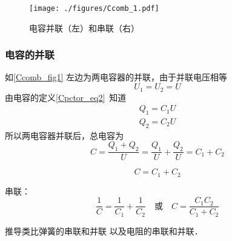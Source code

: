 

\begin{figure}[ht]
\centering
\texttt{[image: ./figures/Ccomb\_1.pdf]}
\caption{电容并联（左）和串联（右）} \label{Ccomb_fig1}
\end{figure}

\subsubsection{电容的并联}
如\autoref{Ccomb_fig1} 左边为两电容器的并联，由于并联电压相等
\begin{equation}
U_1=U_2=U
\end{equation}
由电容的定义\autoref{Cpctor_eq2}~知道
\begin{equation}
\begin{aligned}
Q_1=C_1U\\
Q_2=C_2U
\end{aligned}
\end{equation}
所以两电容器并联后，总电容为
\begin{equation}
C=\frac{Q_1+Q_2}{U}=\frac{Q_1}{U}+\frac{Q_2}{U}=C_1+C_2
\end{equation}


\begin{equation}
C = C_1 + C_2
\end{equation}

串联：
\begin{equation}
\frac{1}{C} = \frac{1}{C_1} + \frac{1}{C_2}
\quad \text{或} \quad
C = \frac{C_1C_2}{C_1 + C_2}
\end{equation}

推导类比弹簧的串联和并联 以及电阻的串联和并联．

